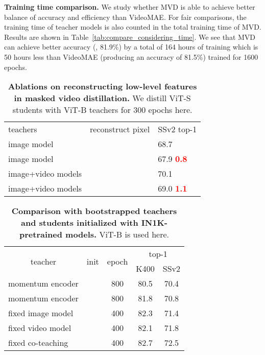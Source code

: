 \documentclass[10pt,twocolumn,letterpaper]{article}
\newcommand{\cmark}{\ding{51}}
\newcommand{\xmark}{\ding{55}}
\newcommand{\Down}[1]{\textcolor{red}{\xspace\small{\bf #1}}}
\begin{document}
\vspace{0.05in}
\noindent \textbf{Training time comparison.} We study whether MVD is able to achieve better balance of accuracy and efficiency than VideoMAE. For fair comparisons, the training time of teacher models is also counted in the total training time of MVD. Results are shown in Table~\ref{tab:compare_considering_time}. We see that MVD can achieve better accuracy (\ie, 81.9\%) by a total of 164 hours of training which is 50 hours less than 
VideoMAE (producing an accuracy of 81.5\%) trained for 1600 epochs.


\begin{table}[t]
\centering
\begin{tabular}{lc|l}
teachers & reconstruct pixel & SSv2 top-1 \\
\shline
image model & \xmark &  68.7 \\
image model & \cmark &  67.9 \Down{0.8}   \\
\hline
image+video models & \xmark &  70.1 \\
image+video models & \cmark & 69.0 \Down{1.1} \\
\end{tabular}
\caption{\textbf{Ablations on reconstructing low-level features in masked video distillation.} We distill ViT-S students with ViT-B teachers for 300 epochs here.}
\label{tab:low-level-feat}
\vspace{-2pt}
\end{table}


\begin{table}[t]
\centering
\begin{tabular}{l|c|c|c|c}
\multicolumn{1}{c|}{\multirow{2}{*}{teacher}} & \multicolumn{1}{c|}{\multirow{2}{*}{init}} & \multicolumn{1}{c|}{\multirow{2}{*}{epoch}} & \multicolumn{2}{c}{top-1} \\
\cline{4-5} 
\multicolumn{1}{l|}{}     & \multicolumn{1}{l|}{} & \multicolumn{1}{l|}{} & \multicolumn{1}{l|}{K400} & SSv2       \\ 
\shline
momentum encoder & \xmark & 800 & 80.5 & 70.4   \\
momentum encoder & \cmark & 800 & 81.8 & 70.8  \\
fixed image model & \xmark & 400 & 82.3 & 71.4  \\
fixed video model & \xmark & 400 & 82.1 & 71.8   \\
fixed co-teaching & \xmark & 400 & 82.7 & 72.5   \\
\end{tabular}
\caption{\textbf{Comparison with bootstrapped teachers and students initialized with IN1K-pretrained models.} ViT-B is used here.}
\label{tab:bootstrap}
\vspace{-5pt}
\end{table}
\end{document}
